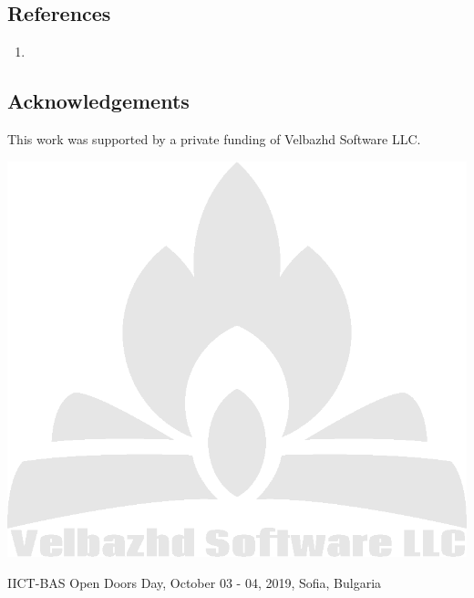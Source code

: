 \documentclass[a0,portrait,25pt]{sciposter}
\begin{document}
\begin{multicols}{3}
\begin{mdframed}[backgroundcolor=white,roundcorner=4pt,shadow=true,linewidth=1pt]
\section*{References}
\begin{enumerate}
  \item 
\end{enumerate}
\end{mdframed}

\begin{mdframed}[backgroundcolor=white,roundcorner=4pt,shadow=true,linewidth=1pt]
\section*{Acknowledgements}
This work was supported by a private funding of Velbazhd Software LLC. 

\includegraphics[width=0.98\linewidth]{veld_soft_camp_fire_logo}
\end{mdframed}
\end{multicols}

\begin{mdframed}[backgroundcolor=white,roundcorner=4pt,shadow=true,linewidth=1pt]
\color{Black}
IICT-BAS Open Doors Day, October 03 - 04, 2019, Sofia, Bulgaria
\end{mdframed}
\end{document}
